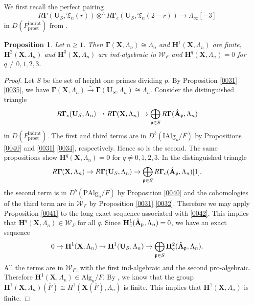 \documentclass{amsart}
\newtheorem{Prop}[Thm]{Proposition}
\theoremstyle{remark}
\numberwithin{equation}{section}
\newcommand{\isomto}{\overset{\sim}{\to}}
\newcommand{\tensor}{\mathbin{\otimes}}
\newcommand{\closure}[1]{\overline{#1}}
\newcommand{\et}{\mathrm{et}}
\newcommand{\rat}{\mathrm{rat}}
\newcommand{\ind}{\mathrm{ind}}
\newcommand{\pro}{\mathrm{pro}}
\newcommand{\Alg}{\mathrm{Alg}}
\newcommand{\Ind}{\mathrm{I}}
\newcommand{\Pro}{\mathrm{P}}
\newcommand{\alg}[1]{\mathbf{#1}}
\newcommand{\ideal}[1]{\mathfrak{#1}}
\begin{document}
We first recall the perfect pairing
	\begin{equation} \label{0108}
				R \alg{\Gamma}(\alg{U}_{S}, \mathfrak{T}_{n}(r))
			\tensor^{L}
				R \alg{\Gamma}_{c}(\alg{U}_{S}, \mathfrak{T}_{n}(2 - r))
		\to
			\Lambda_{\infty}[-3]
	\end{equation}
in $D(F^{\ind\rat}_{\pro\et})$ from \cite[Theorem 10.6.1]{Suz24}.

\begin{Prop} \label{0043}
	Let $n \ge 1$.
	Then $\alg{\Gamma}(\alg{X}, \Lambda_{n}) \cong \Lambda_{n}$ and
	$\alg{H}^{1}(\alg{X}, \Lambda_{n})$ are finite,
	$\alg{H}^{2}(\alg{X}, \Lambda_{n})$ and $\alg{H}^{3}(\alg{X}, \Lambda_{n})$ are ind-algebraic in $\mathcal{W}_{F}$
	and $\alg{H}^{q}(\alg{X}, \Lambda_{n}) = 0$ for $q \ne 0, 1, 2, 3$.
\end{Prop}

\begin{proof}
	Let $S$ be the set of height one primes dividing $p$.
	By Proposition \ref{0031} \eqref{0035}, we have 
	$\alg{\Gamma}(\alg{X}, \Lambda_{n}) \isomto \alg{\Gamma}(\alg{U}_{S}, \Lambda_{n}) \cong \Lambda_{n}$.
	Consider the distinguished triangle
		\[
				R \alg{\Gamma}_{c}(\alg{U}_{S}, \Lambda_{n})
			\to
				R \alg{\Gamma}(\alg{X}, \Lambda_{n})
			\to
				\bigoplus_{\ideal{p} \in S}
					R \alg{\Gamma}(\Hat{\alg{A}}_{\ideal{p}}, \Lambda_{n})
		\]
	in $D(F^{\ind\rat}_{\pro\et})$.
	The first and third terms are in $D^{b}(\Ind \Alg_{u} / F)$
	by Propositions \ref{0040} and \ref{0031} \eqref{0034}, respectively.
	Hence so is the second.
	The same propositions show $\alg{H}^{q}(\alg{X}, \Lambda_{n}) = 0$ for $q \ne 0, 1, 2, 3$.
	In the distinguished triangle
		\begin{equation} \label{0042}
				R \alg{\Gamma}(\alg{X}, \Lambda_{n})
			\to
				R \alg{\Gamma}(\alg{U}_{S}, \Lambda_{n})
			\to
				\bigoplus_{\ideal{p} \in S}
					R \alg{\Gamma}_{c}(\Hat{\alg{A}}_{\ideal{p}}, \Lambda_{n})[1],
		\end{equation}
	the second term is in $D^{b}(\Pro \Alg_{u} / F)$
	by Proposition \ref{0040}
	and the cohomologies of the third term are in $\mathcal{W}_{F}$
	by Proposition \ref{0031} \eqref{0032}.
	Therefore we may apply Proposition \ref{0041} to
	the long exact sequence associated with \eqref{0042}.
	This implies that $\alg{H}^{q}(\alg{X}, \Lambda_{n}) \in \mathcal{W}_{F}$ for all $q$.
	Since $\alg{H}^{1}_{c}(\Hat{\alg{A}}_{\ideal{p}}, \Lambda_{n}) = 0$,
	we have an exact sequence
		\[
				0
			\to
				\alg{H}^{1}(\alg{X}, \Lambda_{n})
			\to
				\alg{H}^{1}(\alg{U}_{S}, \Lambda_{n})
			\to
				\bigoplus_{\ideal{p} \in S}
					\alg{H}^{2}_{c}(\Hat{\alg{A}}_{\ideal{p}}, \Lambda_{n}).
		\]
	All the terms are in $\mathcal{W}_{F}$,
	with the first ind-algebraic and the second pro-algebraic.
	Therefore $\alg{H}^{1}(\alg{X}, \Lambda_{n}) \in \Alg_{u} / F$.
	By \cite[Theorem 1.2]{Suz23}, we know that
	the group
		$
				\alg{H}^{1}(\alg{X}, \Lambda_{n})(\closure{F})
			\cong
				H^{1}(\alg{X}(\closure{F}), \Lambda_{n})
		$
	is finite.
	This implies that $\alg{H}^{1}(\alg{X}, \Lambda_{n})$ is finite.
\end{proof}
\end{document}
